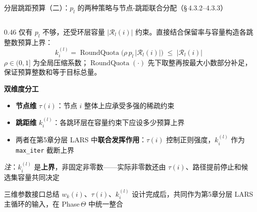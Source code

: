 \documentclass[aspectratio=169,9pt,xcolor=dvipsnames]{beamer}
\begin{document}
\begin{frame}{分层跳距预算（二）：$p_l$ 的两种策略与节点-跳距联合分配（§\,4.3.2--4.3.3）}
\begin{columns}[T]
\begin{column}{0.46\textwidth}
  \smallskip
  仅有 $p_l$ 不够，还受环层容量 $|\mathcal{R}_l(i)|$ 约束。直接结合保留率与容量构造各跳整数预算上界：
  \begin{equation*}
    k_i^{(l)}
    = \operatorname{RoundQuota}\!\bigl(\rho\,p_l\,|\mathcal{R}_l(i)|\bigr)
    \;\leq\; |\mathcal{R}_l(i)|
  \end{equation*}
  $\rho\in(0,1]$ 为全局压缩系数；$\operatorname{RoundQuota}(\cdot)$ 先下取整再按最大小数部分补足，保证预算整数和等于目标总量。

  \smallskip
  \textbf{双维度分工}
  \begin{itemize}\small\setlength{\itemsep}{2pt}
    \item \textbf{节点维} $\tau(i)$：节点 $i$ 整体上应承受多强的稀疏约束
    \item \textbf{跳距维} $k_i^{(l)}$：各跳环层在容量约束下应设多少预算上界
    \item 两者在第5章分层 LARS 中\textbf{联合发挥作用}：$\tau(i)$ 控制正则强度，$k_i^{(l)}$ 作为 \texttt{max\_iter} 截断上界
  \end{itemize}

  \smallskip
  \textit{注}：$k_i^{(l)}$ 是\textbf{上界}，非固定非零数——实际非零数还由 $\tau(i)$、路径提前停止和候选集容量共同决定

  \begin{alertblock}{三维参数接口总结}
    \small $w_k(i)$、$\tau(i)$、$k_i^{(l)}$ 设计完成后，共同作为第5章分层 LARS 主循环的输入，在 Phase\,$\Theta$ 中统一整合
  \end{alertblock}
\end{column}
\end{columns}
\end{frame}
\end{document}

